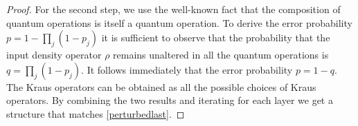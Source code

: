 \documentclass[10pt,a4paper]{amsart}
\begin{document}
\begin{proof}
For the second step, we use the well-known fact that the composition of quantum operations is itself a quantum operation. 
To derive the error probability $p=1-\prod_j (1-p_j)$ it is sufficient to observe that the probability that the input density operator $\rho$ 
remains unaltered in all the quantum operations is $q=\prod_j (1-p_j)$. It follows immediately that the error probability $p=1-q$.
The Kraus operators can be obtained as all the possible choices of Kraus operators.
By combining the two results and iterating for each layer we get a structure that matches \eqref{perturbedlast}.
\end{proof}
\end{document}
